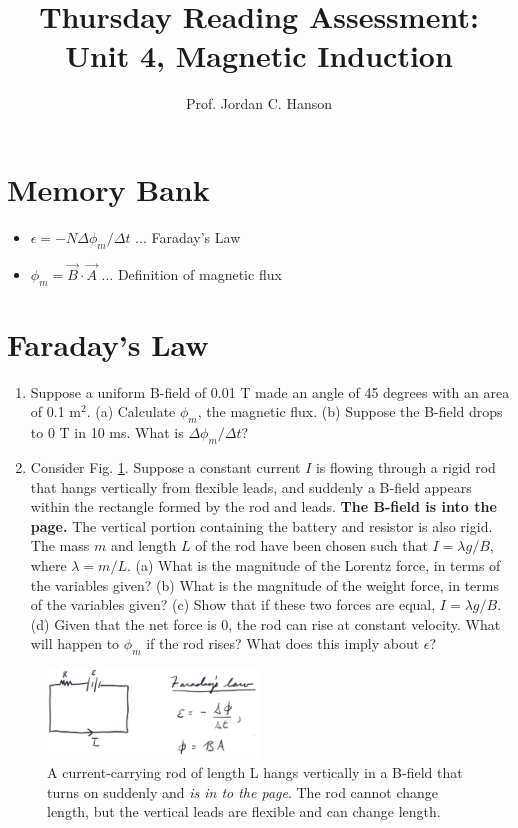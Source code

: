 \documentclass{article}
\begin{document}
\title{Thursday Reading Assessment: Unit 4, Magnetic Induction}
\author{Prof. Jordan C. Hanson}

\maketitle

\section{Memory Bank}

\begin{itemize}
\item $\epsilon = -N \Delta \phi_m /\Delta t$ ... Faraday's Law
\item $\phi_m = \vec{B} \cdot \vec{A}$ ... Definition of magnetic flux
\end{itemize}

\section{Faraday's Law}

\begin{enumerate}
\item Suppose a uniform B-field of 0.01 T made an angle of 45 degrees with an area of 0.1 m$^2$.  (a) Calculate $\phi_m$, the magnetic flux. (b) Suppose the B-field drops to 0 T in 10 ms.  What is $\Delta \phi_m / \Delta t$? \\ \vspace{2cm}
\item Consider Fig. \ref{fig:current}.  Suppose a constant current $I$ is flowing through a rigid rod that hangs vertically from flexible leads, and suddenly a B-field appears within the rectangle formed by the rod and leads.  \textbf{The B-field is into the page.}  The vertical portion containing the battery and resistor is also rigid.  The mass $m$ and length $L$ of the rod have been chosen such that $I = \lambda g / B$, where $\lambda = m/L$.  (a) What is the magnitude of the Lorentz force, in terms of the variables given?  (b) What is the magnitude of the weight force, in terms of the variables given?  (c)  Show that if these two forces are equal, $I = \lambda g / B$. (d) Given that the net force is 0, the rod can rise at constant velocity.  What will happen to $\phi_m$ if the rod rises?  What does this imply about $\epsilon$? 
\end{enumerate}
\begin{figure}
\centering
\includegraphics[width=0.5\textwidth]{current.png}
\caption{\label{fig:current} A current-carrying rod of length L hangs vertically in a B-field that turns on suddenly and \textit{is in to the page}.  The rod cannot change length, but the vertical leads are flexible and can change length.}
\end{figure}
\end{document}
